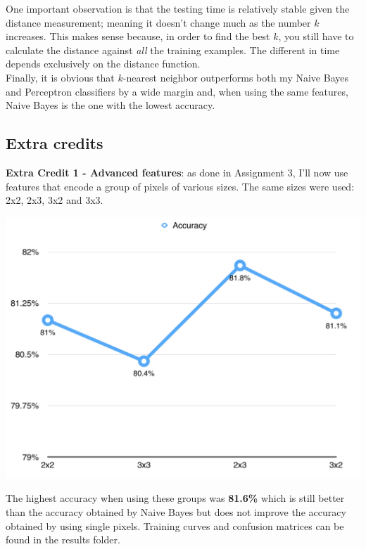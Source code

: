 \documentclass[11pt]{article}
\begin{document}
One important observation is that the testing time is relatively stable given the distance measurement; meaning it doesn't change much as the number $k$ increases. This makes sense because, in order to find the best $k$, you still have to calculate the distance against \textit{all} the training examples. The different in time depends exclusively on the distance function. \\

Finally, it is obvious that $k$-nearest neighbor outperforms both my Naive Bayes and Perceptron classifiers by a wide margin and, when using the same features, Naive Bayes is the one with the lowest accuracy.

\subsection*{Extra credits}

\textbf{Extra Credit 1 - Advanced features}: as done in Assignment 3, I'll now use features that encode a group of pixels of various sizes. The same sizes were used: 2x2, 2x3, 3x2 and 3x3. \\

\begin{center}
\includegraphics[scale=0.65]{part1.ec1/groups.png}
\end{center}

The highest accuracy when using these groups was \textbf{81.6\%} which is still better than the accuracy obtained by Naive Bayes but does not improve the accuracy obtained by using single pixels. Training curves and confusion matrices can be found in the results folder.\\
\end{document}
